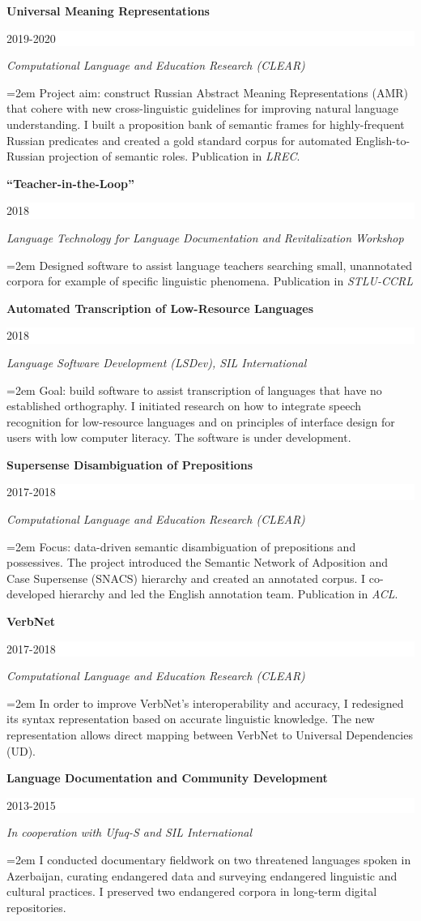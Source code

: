 \documentclass[paper=a4,fontsize=11pt]{article} %
\newcommand{\sepspace}{\vspace*{1em}}		%
\newcommand{\EducationEntry}[4]{
		\noindent \textbf{#1} \hfill      %
		\colorbox{White}{%
			\parbox{6em}{%
			\hfill\color{Black}#2}} \par  %
		\noindent \textit{#3} \par        %
		\noindent\hangindent=2em\hangafter=0 \small #4 %
		\normalsize \par}
\newcommand{\WorkEntry}[4]{				  %
		\noindent \textbf{#1} \hfill      %
		\colorbox{White}{%
			\parbox{6em}{%
			\hfill\color{Black}#2}} \par  %
		\noindent \textit{#3} \par              %
		\noindent\hangindent=2em\hangafter=0 \small #4 %
		\normalsize \par}
\begin{document}
\WorkEntry{Universal Meaning Representations}{2019-2020}{Computational Language and Education Research (CLEAR)}{Project aim: construct Russian Abstract Meaning Representations (AMR) that cohere with new cross-linguistic guidelines for improving natural language understanding. I built a proposition bank of semantic frames for %
highly-frequent Russian predicates and created a gold standard corpus for automated English-to-Russian projection of semantic roles. Publication in \textit{LREC}.}
\sepspace

\WorkEntry{``Teacher-in-the-Loop''}{2018}{Language Technology for Language Documentation and Revitalization Workshop}{Designed software to assist language teachers searching small, unannotated corpora for example of specific linguistic phenomena. Publication in \textit{STLU-CCRL}}
\sepspace

\WorkEntry{Automated Transcription of Low-Resource Languages}{2018}{Language Software Development (LSDev), SIL International}{Goal: build software to assist transcription of languages that have no established orthography. I initiated research on how to integrate speech recognition for low-resource languages and on principles of interface design for users with low computer literacy. The software is under development.}
\sepspace

\WorkEntry{Supersense Disambiguation of Prepositions}{2017-2018}{Computational Language and Education Research (CLEAR)}{Focus: data-driven semantic disambiguation of prepositions and possessives. The project introduced the Semantic Network of Adposition and Case Supersense (SNACS) hierarchy and created an annotated corpus. I co-developed hierarchy and led the English annotation team. Publication in \textit{ACL}.}
\sepspace

\WorkEntry{VerbNet}{2017-2018}{Computational Language and Education Research (CLEAR)}{In order to improve VerbNet's interoperability and accuracy, I redesigned its syntax representation based on accurate linguistic knowledge. The new representation allows direct mapping between VerbNet to Universal Dependencies (UD).}
\sepspace

\WorkEntry{Language Documentation and Community Development}{2013-2015}{In cooperation with Ufuq-S and SIL International}{I conducted documentary fieldwork on two threatened languages spoken in Azerbaijan, curating endangered data and surveying endangered linguistic and cultural practices. I preserved two endangered corpora in long-term digital repositories.}
\sepspace
\end{document}
